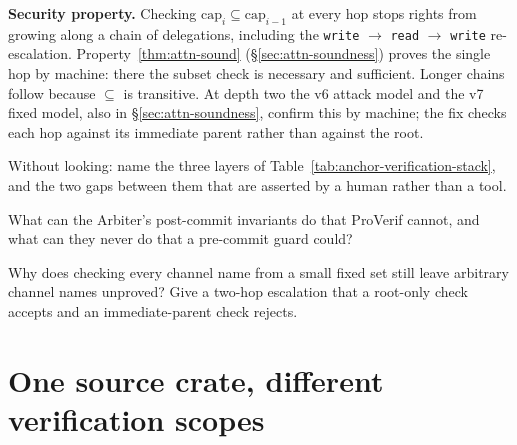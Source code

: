 \documentclass[11pt,a4paper]{article}
\theoremstyle{definition}
\begin{document}
\textbf{Security property.} Checking $\text{cap}_i \subseteq \text{cap}_{i-1}$ at every hop stops rights from growing along a chain of delegations, including the \texttt{write} $\to$ \texttt{read} $\to$ \texttt{write} re-escalation. Property~\ref{thm:attn-sound} (\S\ref{sec:attn-soundness}) proves the single hop by machine: there the subset check is necessary and sufficient. Longer chains follow because $\subseteq$ is transitive. At depth two the v6 attack model and the v7 fixed model, also in \S\ref{sec:attn-soundness}, confirm this by machine; the fix checks each hop against its immediate parent rather than against the root.

\pdexercisepointer*{\ref{ex:anchor-algconfusion}}{\ref{ex:anchor-chain-replay}}{\pageref{ex:anchor-algconfusion}}
\begin{pdrecitation}
\item Without looking: name the three layers of Table~\ref{tab:anchor-verification-stack}, and the two gaps between them that are asserted by a human rather than a tool.
\item What can the Arbiter's post-commit invariants do that ProVerif cannot, and what can they never do that a pre-commit guard could?
\item Why does checking every channel name from a small fixed set still leave arbitrary channel names unproved? Give a two-hop escalation that a root-only check accepts and an immediate-parent check rejects.
\end{pdrecitation}


\section{One source crate, different verification scopes}\label{sec:implementation}
\end{document}
